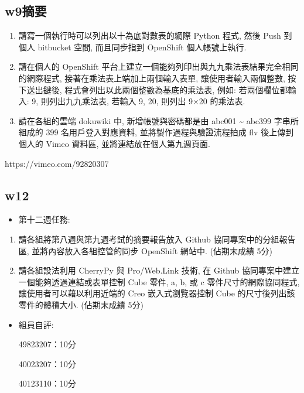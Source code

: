 \documentclass[]{article}
\begin{document}
\subsection{w9摘要}\label{w9ux6458ux8981}

\begin{enumerate}
\def\labelenumi{\arabic{enumi}.}
\item
  請寫一個執行時可以列出以十為底對數表的網際 Python 程式, 然後 Push
  到個人 bitbucket 空間, 而且同步指到 OpenShift 個人帳號上執行.
\item
  請在個人的 OpenShift
  平台上建立一個能夠列印出與九九乘法表結果完全相同的網際程式,
  接著在乘法表上端加上兩個輸入表單, 讓使用者輸入兩個整數, 按下送出鍵後,
  程式會列出以此兩個整數為基底的乘法表, 例如: 若兩個欄位都輸入: 9,
  則列出九九乘法表, 若輸入 9, 20, 則列出 9×20 的乘法表.
\item
  請在各組的雲端 dokuwiki 中, 新增帳號與密碼都是由 abc001
  \textasciitilde{} abc399 字串所組成的 399 名用戶登入對應資料,
  並將製作過程與驗證流程拍成 flv 後上傳到個人的 Vimeo 資料區,
  並將連結放在個人第九週頁面.
\end{enumerate}

https://vimeo.com/92820307

\subsection{w12}\label{w12-1}

\begin{itemize}
\itemsep1pt\parskip0pt
\item
  第十二週任務:
\end{itemize}

\begin{enumerate}
\def\labelenumi{\arabic{enumi}.}
\itemsep1pt\parskip0pt
\item
  請各組將第八週與第九週考試的摘要報告放入 Github
  協同專案中的分組報告區, 並將內容放入各組控管的同步 OpenShift 網站中.
  (佔期末成績 5分)
\item
  請各組設法利用 CherryPy 與 Pro/Web.Link 技術, 在 Github
  協同專案中建立一個能夠透過連結或表單控制 Cube 零件, a, b, 或 c
  零件尺寸的網際協同程式, 讓使用者可以藉以利用近端的 Creo
  嵌入式瀏覽器控制 Cube 的尺寸後列出該零件的體積大小. (佔期末成績 5分)
\end{enumerate}

\begin{itemize}
\item
  組員自評:

  49823207：10分

  40023207：10分

  40123110：10分
\end{itemize}
\end{document}

